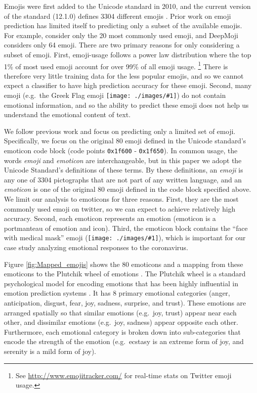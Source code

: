 \documentclass[11pt]{article}
\newcommand{\defn}[1]{\emph{{#1}}}
\newcommand{\emoji}[1]{\texttt{[image: ./images/\#1]}}
\begin{document}
Emojis were first added to the Unicode standard in 2010,
and the current version of the standard (12.1.0) defines 3304 different emojis \citep{unicode12}.
Prior work on emoji prediction has limited itself to predicting only a subset of the available emojis.
For example, \citet{barbieri2017emojis} consider only the 20 most commonly used emoji,
and DeepMoji \citep{felbo2017using} considers only 64 emoji.
There are two primary reasons for only considering a subset of emoji.
First, emoji-usage follows a power law distribution where the top 1\% of most used emoji account for over 99\% of all emoji usage.%
\footnote{
    See \url{http://www.emojitracker.com/} for real-time stats on Twitter emoji usage.
}
There is therefore very little training data for the less popular emojis,
and so we cannot expect a classifier to have high prediction accuracy for these emoji.
Second, many emoji (e.g.\ the Greek Flag emoji \emoji{flag-greece_1f1ec-1f1f7}) do not contain emotional information,
and so the ability to predict these emoji does not help us understand the emotional content of text.

We follow previous work and focus on predicting only a limited set of emoji.
Specifically, we focus on the original 80 emoji defined in the Unicode standard's emoticon code block (code points \texttt{0x1f600} - \texttt{0x1f650}). %
    In common usage, the words \defn{emoji} and \defn{emoticon} are interchangeable,
    but in this paper we adopt the Unicode Standard's definitions of these terms.
    By these definitions, an \defn{emoji} is any one of 3304 pictographs that are not part of any written language,
    and an \defn{emoticon} is one of the original 80 emoji defined in the code block specified above.
We limit our analysis to emoticons for three reasons.
First, they are the most commonly used emoji on twitter,
so we can expect to achieve relatively high accuracy.
Second, each emoticon represents an emotion (emoticon is a portmanteau of emotion and icon).
Third, the emoticon block contains the ``face with medical mask'' emoji (\emoji{mask_photo.png}),
which is important for our case study analyzing emotional responses to the coronavirus.

Figure \ref{fig:Mapped_emojis} shows the 80 emoticons and a mapping from these emoticons to the Plutchik wheel of emotions \citep{plutchik1991emotions}.
The Plutchik wheel is a standard psychological model for encoding emotions that has been highly influential in emotion prediction systems \citep[e.g.][]{suttles2013distant,kant2018practical,liu2019dens}.
It has 8 primary emotional categories (anger, anticipation, disgust, fear, joy, sadness, surprise, and trust).
These emotions are arranged spatially so that similar emotions (e.g.\ joy, trust) appear near each other, and dissimilar emotions (e.g.\ joy, sadness) appear opposite each other.
Furthermore, each emotional category is broken down into sub-categories that encode the strength of the emotion (e.g.\ ecstasy is an extreme form of joy, and serenity is a mild form of joy).
\end{document}
